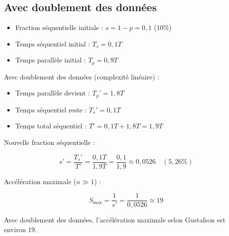 \documentclass{article}
\begin{document}
\subsection*{Avec doublement des données}
\begin{itemize}
    \item Fraction séquentielle initiale : $s = 1 - p = 0,1$ (10\%)
    \item Temps séquentiel initial : $T_s = 0,1T$
    \item Temps parallèle initial : $T_p = 0,9T$
\end{itemize}

Avec doublement des données (complexité linéaire) :
\begin{itemize}
    \item Temps parallèle devient : $T_p' = 1,8T$
    \item Temps séquentiel reste : $T_s' = 0,1T$
    \item Temps total séquentiel : $T' = 0,1T + 1,8T = 1,9T$
\end{itemize}

Nouvelle fraction séquentielle :

\[
s' = \frac{T_s'}{T'} = \frac{0,1T}{1,9T} = \frac{0,1}{1,9} \approx 0,0526 \quad (5,26\%)
\]

Accélération maximale ($n \gg 1$) :

\[
S_{\text{max}} = \frac{1}{s'} = \frac{1}{0,0526} \approx 19
\]

Avec doublement des données, l'accélération maximale selon Gustafson est environ 19.
\end{document}
